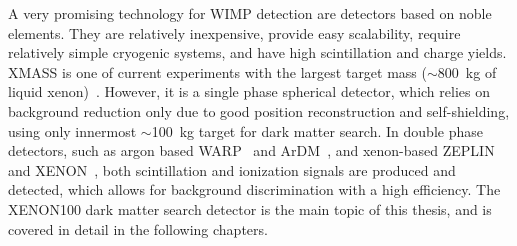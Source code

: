 
A very promising technology for WIMP detection are detectors based on noble elements. They are relatively inexpensive, provide easy scalability, require relatively simple cryogenic systems, and have high scintillation and charge yields. XMASS is one of current experiments with the largest target mass ($\sim$800~kg of liquid xenon)~\cite{XMASS}. However, it is a single phase spherical detector, which relies on background reduction only due to good position reconstruction and self-shielding, using only innermost $\sim$100~kg target for dark matter search. In double phase detectors, such as argon based WARP~\cite{WARP} and ArDM~\cite{ArDM}, and xenon-based ZEPLIN~\cite{ZEPLIN} and XENON~\cite{xe100-instrument, EMBG, xe100-run07, xe100-run08}, both scintillation and ionization signals are produced and detected, which allows for background discrimination with a high efficiency. The XENON100 dark matter search detector is the main topic of this thesis, and is covered in detail in the following chapters.






